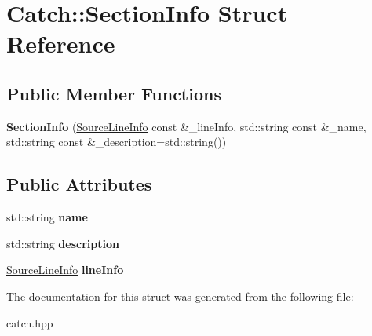 \hypertarget{structCatch_1_1SectionInfo}{}\section{Catch\+:\+:Section\+Info Struct Reference}
\label{structCatch_1_1SectionInfo}
\subsection*{Public Member Functions}
\begin{DoxyCompactItemize}
\item 
{\bfseries Section\+Info} (\hyperlink{structCatch_1_1SourceLineInfo}{Source\+Line\+Info} const \&\+\_\+line\+Info, std\+::string const \&\+\_\+name, std\+::string const \&\+\_\+description=std\+::string())\hypertarget{structCatch_1_1SectionInfo_a27aff3aaf8b6611f3651b17111a272c6}{}\label{structCatch_1_1SectionInfo_a27aff3aaf8b6611f3651b17111a272c6}

\end{DoxyCompactItemize}
\subsection*{Public Attributes}
\begin{DoxyCompactItemize}
\item 
std\+::string {\bfseries name}\hypertarget{structCatch_1_1SectionInfo_a704c8fc662d309137e0d4f199cb7df58}{}\label{structCatch_1_1SectionInfo_a704c8fc662d309137e0d4f199cb7df58}

\item 
std\+::string {\bfseries description}\hypertarget{structCatch_1_1SectionInfo_a0052060219a6de74bb7ade34d4163a4e}{}\label{structCatch_1_1SectionInfo_a0052060219a6de74bb7ade34d4163a4e}

\item 
\hyperlink{structCatch_1_1SourceLineInfo}{Source\+Line\+Info} {\bfseries line\+Info}\hypertarget{structCatch_1_1SectionInfo_adbc83b8a3507c4acc8ee249e93465711}{}\label{structCatch_1_1SectionInfo_adbc83b8a3507c4acc8ee249e93465711}

\end{DoxyCompactItemize}


The documentation for this struct was generated from the following file\+:\begin{DoxyCompactItemize}
\item 
catch.\+hpp\end{DoxyCompactItemize}
